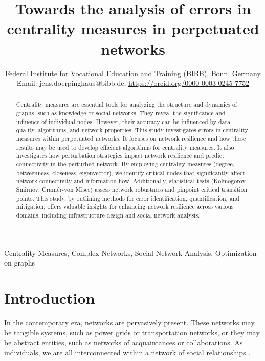 \documentclass[conference]{IEEEtran} %
\title{Towards the analysis of errors in centrality measures in perpetuated networks}
\author{
\IEEEauthorblockN{Meetkumar Pravinbhai Mangroliya\IEEEauthorrefmark{1}%
, Jens D\"orpinghaus\IEEEauthorrefmark{1}\IEEEauthorrefmark{2}, Robert Rockenfeller\IEEEauthorrefmark{1}}%
\IEEEauthorblockA{%
\IEEEauthorrefmark{1}  University of Koblenz, Germany\\ Email: meetmangroliya987@uni-koblenz.de, \url{https://orcid.org/0009-0003-3727-9527}}
\IEEEauthorrefmark{2} Federal Institute for Vocational Education and Training (BIBB), Bonn, Germany\\ Email: jens.doerpinghaus@bibb.de, \url{https://orcid.org/0000-0003-0245-7752}
}
\begin{document}
\maketitle              %

\begin{abstract}
Centrality measures are essential tools for analyzing the structure and dynamics of graphs, such as knowledge or social networks. They reveal the significance and influence of individual nodes. However, their accuracy can be influenced by data quality, algorithms, and network properties. This study investigates errors in centrality measures within perpetuated networks. It focuses on network resilience and how these results may be used to develop efficient algorithms for centrality measures. It also investigates how perturbation strategies impact network resilience and predict connectivity in the perturbed network. By employing centrality measures (degree, betweenness, closeness, eigenvector), we identify critical nodes that significantly affect network connectivity and information flow. Additionally, statistical tests (Kolmogorov-Smirnov, Cramér-von Mises) assess network robustness and pinpoint critical transition points. This study, by outlining methods for error identification, quantification, and mitigation, offers valuable insights for enhancing network resilience across various domains, including infrastructure design and social network analysis.
\end{abstract}

\begin{IEEEkeywords}
Centrality Measures, Complex Networks, Social Network Analysis, Optimization on graphs
\end{IEEEkeywords}

\section{Introduction}

In the contemporary era, networks are pervasively present. These networks may be tangible systems, such as power grids or transportation networks, or they may be abstract entities, such as networks of acquaintances or collaborations. As individuals, we are all interconnected within a network of social relationships \cite{boccaletti2006complex,dorpinghaus2022social}.
\end{document}

